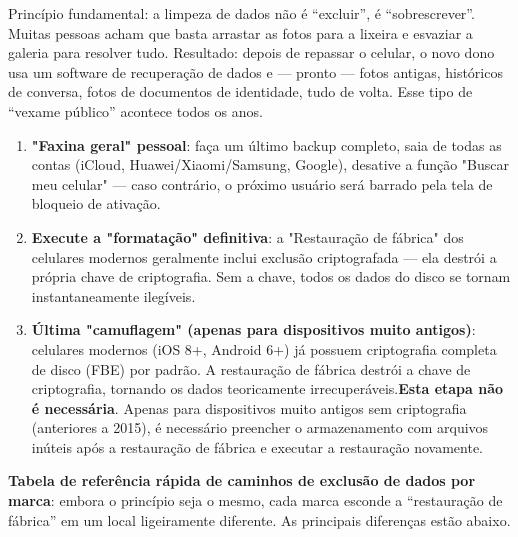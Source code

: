 


Princípio fundamental: a limpeza de dados não é “excluir”, é “sobrescrever”. Muitas pessoas acham que basta arrastar as fotos para a lixeira e esvaziar a galeria para resolver tudo. Resultado: depois de repassar o celular, o novo dono usa um software de recuperação de dados e — pronto — fotos antigas, históricos de conversa, fotos de documentos de identidade, tudo de volta. Esse tipo de “vexame público” acontece todos os anos.

\begin{enumerate}
  \item \textbf{"Faxina geral" pessoal}: faça um último backup completo, saia de todas as contas (iCloud, Huawei/Xiaomi/Samsung, Google), desative a função "Buscar meu celular" — caso contrário, o próximo usuário será barrado pela tela de bloqueio de ativação.
  \item \textbf{Execute a "formatação" definitiva}: a "Restauração de fábrica" dos celulares modernos geralmente inclui exclusão criptografada — ela destrói a própria chave de criptografia. Sem a chave, todos os dados do disco se tornam instantaneamente ilegíveis.
  \item \textbf{Última "camuflagem" (apenas para dispositivos muito antigos)}: celulares modernos (iOS 8+, Android 6+) já possuem criptografia completa de disco (FBE) por padrão. A restauração de fábrica destrói a chave de criptografia, tornando os dados teoricamente irrecuperáveis.\textbf{Esta etapa não é necessária}. Apenas para dispositivos muito antigos sem criptografia (anteriores a 2015), é necessário preencher o armazenamento com arquivos inúteis após a restauração de fábrica e executar a restauração novamente.
\end{enumerate}

\textbf{Tabela de referência rápida de caminhos de exclusão de dados por marca}: embora o princípio seja o mesmo, cada marca esconde a “restauração de fábrica” em um local ligeiramente diferente. As principais diferenças estão abaixo.


